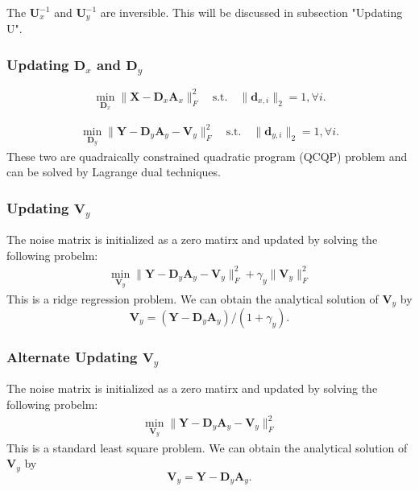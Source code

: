 \documentclass[10pt,twocolumn,letterpaper]{article}
\begin{document}
The $\mathbf{U}_{x}^{-1}$ and $\mathbf{U}_{y}^{-1}$ are inversible. This will be discussed in subsection "Updating U".

\subsubsection{Updating $\mathbf{D}_{x}$ and $\mathbf{D}_{y}$}
\begin{equation}
\min_{\mathbf{D}_{x}}
\|\mathbf{X}-\mathbf{D}_{x}\mathbf{A}_{x}\|_{F}^{2}
\quad
\text{s.t.}
\quad
\|\mathbf{d}_{x,i}\|_{2}=1,
\forall{i}.
\end{equation}

\begin{equation}
\begin{split}
\min_{\mathbf{D}_{y}}
\|\mathbf{Y}-\mathbf{D}_{y}\mathbf{A}_{y}-\mathbf{V}_{y}\|_{F}^{2}
\quad 
\text{s.t.}
\quad 
\|\mathbf{d}_{y,i}\|_{2}=1,
\forall{i}.
\end{split}
\end{equation}
These two are quadraically constrained quadratic program (QCQP) problem and can be solved by Lagrange dual techniques.

\subsubsection{Updating $\mathbf{V}_{y}$}
The noise matrix is initialized as a zero matirx and updated by solving the following probelm:
\begin{equation}
\begin{split}
\min_{\mathbf{V}_{y}}
\|\mathbf{Y}-\mathbf{D}_{y}\mathbf{A}_{y}-\mathbf{V}_{y}\|_{F}^{2}
+
\gamma_{y}\|\mathbf{V}_{y}\|_{F}^{2}
\end{split}
\end{equation}
This is a ridge regression problem. We can obtain the analytical solution of $\mathbf{V}_{y}$ by 
\begin{equation}
\mathbf{V}_{y} = (\mathbf{Y}-\mathbf{D}_{y}\mathbf{A}_{y})/(1+\gamma_{y}).
\end{equation}

\subsubsection{Alternate Updating $\mathbf{V}_{y}$}
The noise matrix is initialized as a zero matirx and updated by solving the following probelm:
\begin{equation}
\begin{split}
\min_{\mathbf{V}_{y}}
\|\mathbf{Y}-\mathbf{D}_{y}\mathbf{A}_{y}-\mathbf{V}_{y}\|_{F}^{2}
\end{split}
\end{equation}
This is a standard least square problem. We can obtain the analytical solution of $\mathbf{V}_{y}$ by 
\begin{equation}
\mathbf{V}_{y} = \mathbf{Y}-\mathbf{D}_{y}\mathbf{A}_{y}.
\end{equation}
\end{document}
